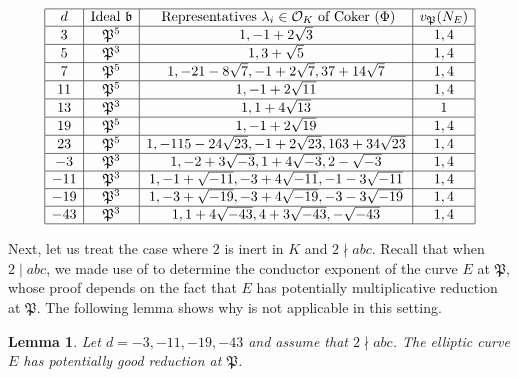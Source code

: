 \documentclass[]{article}
\newtheorem{lemma}{Lemma}
\newcommand {\mfp}{{\mathfrak{P}}}
\begin{document}
\begin{table}
$$\begin{array}{|c|c|c|c|}
\hline d & \text{Ideal $\mathfrak{b}$}  &\text { Representatives } \lambda_i \in \mathcal{O}_K \text { of Coker }(\Phi) & v_{\mfp}(N_E) \\
\hline 3 & \mfp^5  & 1,-1+2\sqrt{3} & 1,4\\
\hline 5 & \mfp^3 & 1,3+\sqrt{5} & 1,4\\
\hline 7 & \mfp^5  & 1,- 21 -8\sqrt{7},-1+2\sqrt{7},37+14\sqrt{7}& 1,4\\
\hline 11 & \mfp^5  & 1,-1+2\sqrt{11} & 1,4\\
\hline 13 & \mfp^3 & 1, 1+4\sqrt{13}& 1\\
\hline 19 & \mfp^5 & 1, -1+2\sqrt{19}& 1,4\\
\hline 23 & \mfp^5 & 1, -115-24\sqrt{23},-1+2\sqrt{23},163+34\sqrt{23}& 1,4\\
\hline -3 & \mfp^3 & 1, -2+3\sqrt{-3}, 1+4 \sqrt{-3}, 2-\sqrt{-3} & 1,4\\
\hline -11 & \mfp^3 & 1, -1+\sqrt{-11},-3+4 \sqrt{-11},  -1-3 \sqrt{-11} & 1,4\\
\hline -19 & \mfp^3 & 1, -3+\sqrt{-19}, -3+4\sqrt{-19}, -3-3\sqrt{-19}& 1,4\\
\hline -43 & \mfp^3 & 1, 1+4\sqrt{-43}, 4+3\sqrt{-43}, -\sqrt{-43} & 1,4\\
\hline
\end{array}$$
\caption{Numerical values associated to Lemma \ref{samir4.4} }
\label{representativetable}
\end{table}

Next, let us treat the case where $2$ is inert in $K$ and $2\nmid abc$. Recall that when $2\mid abc$, we made use of \cite[Lemma 4.4]{freitas2015fermat} to determine the conductor exponent of the curve $E$ at $\mfp$, whose proof depends on the fact that $E$ has potentially multiplicative reduction at $\mfp$. The following lemma shows why \cite[Lemma 4.4]{freitas2015fermat} is not applicable in this setting.

\begin{lemma}\label{lemma: Epotgoodred}
    Let $d=-3,-11,-19,-43$ and assume that $2\nmid abc$. The elliptic curve $E$ has potentially good reduction at $\mfp$.
\end{lemma}
\end{document}
